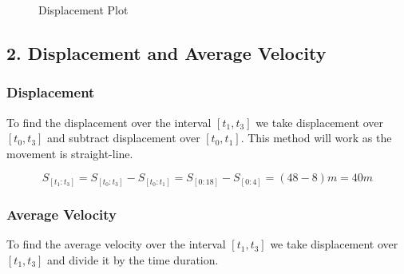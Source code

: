 \documentclass{article}
\begin{document}
\bigbreak \begin{figure}[h!]
    \centering
    \caption{Displacement Plot}
    \label{fig:displacement}
\end{figure}

\raggedright \newpage \subsection*{2. Displacement and Average Velocity}
\subsubsection*{Displacement}
To find the displacement over the interval $[t_1, t_3]$ we take displacement over $[t_0, t_3]$ and subtract displacement over $[t_0, t_1]$.
This method will work as the movement is straight-line.

$$ S_{[t_1: t_3]} = S_{[t_0: t_3]} - S_{[t_0: t_1]} = S_{[0: 18]} - S_{[0: 4]} = (48 - 8)m = 40m $$

\subsubsection*{Average Velocity}
To find the average velocity over the interval $[t_1, t_3]$ we take displacement over $[t_1, t_3]$ and divide it by the time duration.
\end{document}
